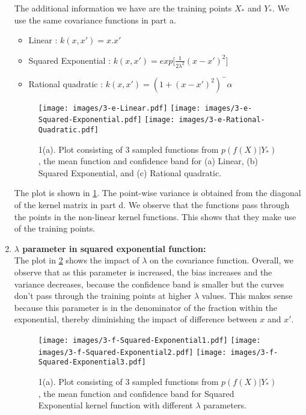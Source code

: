 \begin{enumerate}
{		The additional information we have are the training points $X_{*}$ and $Y_{*}$. We use the same covariance functions in part a. 
		\begin{itemize}
		\item{Linear : $k(x,x') = x.x'$}
		\item{Squared Exponential : $k(x,x') = exp[\frac{1}{2\lambda^2}(x-x')^2$] }
		\item{Rational quadratic : $k(x,x') = (1 + (x-x')^2)^-\alpha$}	
		\end{itemize}

		\begin{figure}[h!]
		\centering
		\texttt{[image: images/3-e-Linear.pdf]}
		\hfill
		\texttt{[image: images/3-e-Squared-Exponential.pdf]}
		\hfill
		\texttt{[image: images/3-e-Rational-Quadratic.pdf]}
		\caption{1(a). Plot consisting of 3 sampled functions from $p(f(X) | Y_{*})$, the mean function and confidence band for (a) Linear, (b) Squared Exponential, and (c) Rational quadratic.}
		\label{fig:1e}
		\end{figure}	
		
		The plot is shown in \cref{fig:1e}. The point-wise variance is obtained from the diagonal of the kernel matrix in part d.
		We observe that the functions pass through the points in the non-linear kernel functions. This shows that they make use of the training points.			
	}	

	\item{
		\textbf{$\lambda$ parameter in squared exponential function:}\\
		
		The plot in \cref{fig:1f} shows the impact of $\lambda$ on the covariance function. Overall, we observe that as this parameter is increased, the bias increases and the variance decreases, because the confidence band is smaller but the curves don't pass through the training points at higher $\lambda$ values. This makes sense because this parameter is in the denominator of the fraction within the exponential, thereby diminishing the impact of difference between $x$ and $x'$.
		
		\begin{figure}[h!]
		\centering
		\texttt{[image: images/3-f-Squared-Exponential1.pdf]}
		\hfill
		\texttt{[image: images/3-f-Squared-Exponential2.pdf]}
		\hfill
		\texttt{[image: images/3-f-Squared-Exponential3.pdf]}
		\caption{1(a). Plot consisting of 3 sampled functions from $p(f(X) | Y_{*})$, the mean function and confidence band for Squared Exponential kernel function with different $\lambda$ parameters.}
		\label{fig:1f}
		\end{figure}			
	
	}
	
\end{enumerate}
